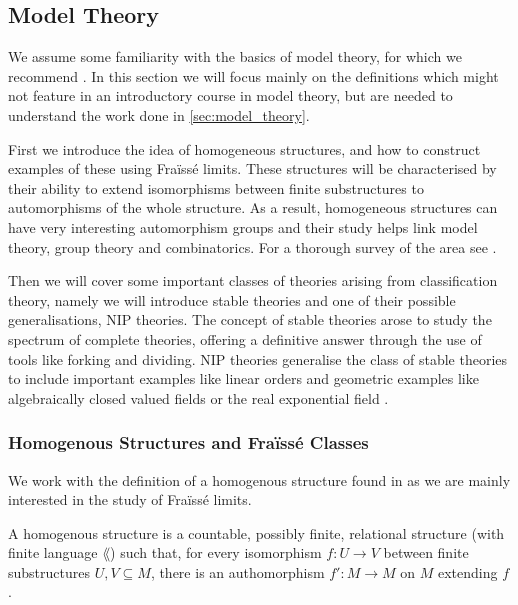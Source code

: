 \newpage

\subsection{Model Theory}%
\label{sub:model_theory}

We assume some familiarity with the basics of model theory, for which we recommend \cite{marker02}.
In this section we will focus mainly on the definitions which might not feature in an introductory
course in model theory, but are needed to understand the work done in \cref{sec:model_theory}.

First we introduce the idea of homogeneous structures, and how to construct examples of these
using Fraïssé limits. These structures will be characterised by their ability to extend isomorphisms
between finite substructures to automorphisms of the whole structure. As a result, homogeneous
structures can have very interesting
automorphism groups and their study helps link model theory, group theory and combinatorics. For a
thorough survey of the area see \cite{macpherson11}.

Then we will cover some important classes of theories arising from classification theory, namely we
will introduce stable theories and one of their possible generalisations, NIP theories. 
The concept of stable theories arose to study the spectrum of complete theories, offering a
definitive answer through the use of tools like forking and dividing. NIP theories generalise the
class of stable theories to include important examples like linear orders and geometric examples
like algebraically closed valued fields \cite{acvf-NIP} or the real exponential field
\cite{steinhorn1999}.

\subsubsection{Homogenous Structures and Fraïssé Classes}%
\label{ssub:homogeneous_structures_and_fraisse_classes}

We work with the definition of a homogenous structure found in \cite{macpherson11} as we are
mainly interested in the study of Fraïssé limits.

\begin{defn}
  A homogenous structure is a countable, possibly finite, relational structure (with finite
  language $\lang$) such that, for every isomorphism $f : U \to V$ between finite substructures
  $U, V \subseteq M$, there is an authomorphism $f' : M \to M$ on $M$ extending $f$.
\end{defn}

